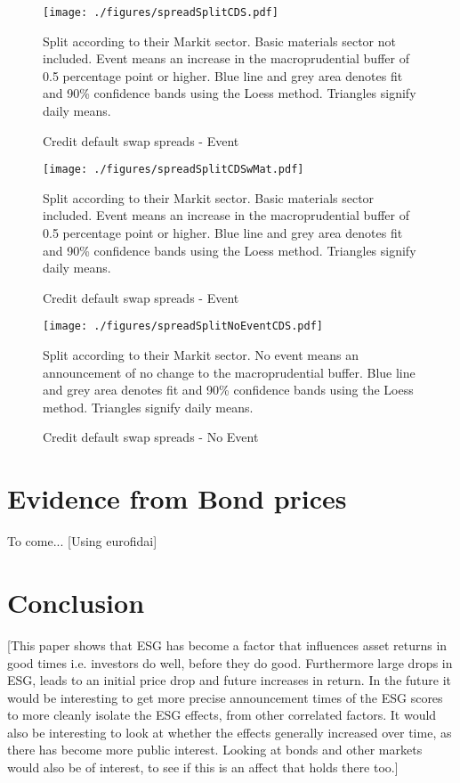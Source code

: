 \documentclass[11pt]{article}
\newcommand\fnote[1]{\captionsetup{font=small}\caption*{#1}}
\begin{document}
\begin{figure}%
	\centering
	\texttt{[image: ./figures/spreadSplitCDS.pdf]}
	\caption{Credit default swap spreads - Event}
	\label{fig:eventCDSSplit}
	\fnote{Split according to their Markit sector. Basic materials sector not included. Event means an increase in the macroprudential buffer of 0.5 percentage point or higher. Blue line and grey area denotes fit and 90\% confidence bands using the Loess method. Triangles signify daily means.}
\end{figure}

\begin{figure}%
	\centering
	\texttt{[image: ./figures/spreadSplitCDSwMat.pdf]}
	\caption{Credit default swap spreads - Event}
	\label{fig:eventCDSSplitwMat}
	\fnote{Split according to their Markit sector. Basic materials sector included. Event means an increase in the macroprudential buffer of 0.5 percentage point or higher. Blue line and grey area denotes fit and 90\% confidence bands using the Loess method. Triangles signify daily means.}
\end{figure}

\begin{figure}%
	\centering
	\texttt{[image: ./figures/spreadSplitNoEventCDS.pdf]}
	\caption{Credit default swap spreads - No Event}
	\label{fig:eventCDSSplitNoEvent}
	\fnote{Split according to their Markit sector. No event means an announcement of no change to the macroprudential buffer. Blue line and grey area denotes fit and 90\% confidence bands using the Loess method. Triangles signify daily means.}
\end{figure}

\section{Evidence from Bond prices}
To come...
[Using eurofidai]

\section{Conclusion}
[This paper shows that ESG has become a factor that influences asset returns in good times i.e. investors do well, before they do good. Furthermore large drops in ESG, leads to an initial price drop and future increases in return. In the future it would be interesting to get more precise announcement times of the ESG scores to more cleanly isolate the ESG effects, from other correlated factors. It would also be interesting to look at whether the effects generally increased over time, as there has become more public interest. Looking at bonds and other markets would also be of interest, to see if this is an affect that holds there too.]
\end{document}
